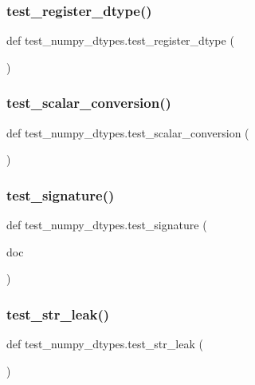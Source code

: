 \subsubsection{\texorpdfstring{test\_register\_dtype()}{test\_register\_dtype()}}
{\footnotesize\ttfamily def test\+\_\+numpy\+\_\+dtypes.\+test\+\_\+register\+\_\+dtype (\begin{DoxyParamCaption}{ }\end{DoxyParamCaption})}

\mbox{\label{namespacetest__numpy__dtypes_a33133ffeed540edf7871c818d625abe4}} 
\subsubsection{\texorpdfstring{test\_scalar\_conversion()}{test\_scalar\_conversion()}}
{\footnotesize\ttfamily def test\+\_\+numpy\+\_\+dtypes.\+test\+\_\+scalar\+\_\+conversion (\begin{DoxyParamCaption}{ }\end{DoxyParamCaption})}

\mbox{\label{namespacetest__numpy__dtypes_aea443d01a341ec754aef51ac459900fd}} 
\subsubsection{\texorpdfstring{test\_signature()}{test\_signature()}}
{\footnotesize\ttfamily def test\+\_\+numpy\+\_\+dtypes.\+test\+\_\+signature (\begin{DoxyParamCaption}\item[{}]{doc }\end{DoxyParamCaption})}

\mbox{\label{namespacetest__numpy__dtypes_addc828dc94fb30b85eb1bfa4f0f8a60c}} 
\subsubsection{\texorpdfstring{test\_str\_leak()}{test\_str\_leak()}}
{\footnotesize\ttfamily def test\+\_\+numpy\+\_\+dtypes.\+test\+\_\+str\+\_\+leak (\begin{DoxyParamCaption}{ }\end{DoxyParamCaption})}

